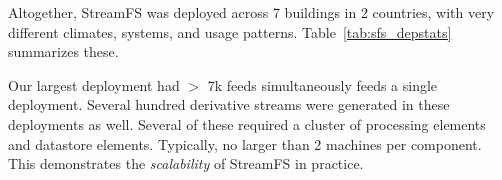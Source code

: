 Altogether, StreamFS was deployed across 7 buildings in 2 countries, with very different climates, systems, and 
usage patterns.  Table~\ref{tab:sfs_depstats} summarizes these.

Our largest deployment had $>$ 7k feeds simultaneously feeds a single deployment.  Several hundred derivative streams were generated
in these deployments as well.  Several of these required a cluster of processing elements and datastore elements.  Typically, no larger
than 2 machines per component.  This demonstrates the \emph{scalability} of StreamFS in practice.

